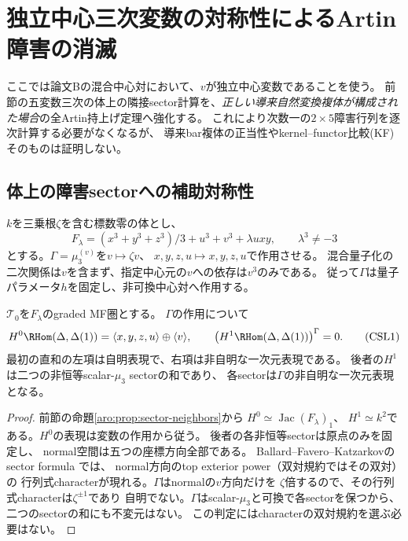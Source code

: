\section{独立中心三次変数の対称性によるArtin障害の消滅}
\label{csl:sec:symmetry}

ここでは論文Bの混合中心対において、$v$が独立中心変数であることを使う。
前節の五変数三次の体上の隣接sector計算を、\emph{正しい導来自然変換複体が構成された場合}の全Artin持上げ定理へ強化する。
これにより次数一の$2\times5$障害行列を逐次計算する必要がなくなるが、
導来bar複体の正当性やkernel--functor比較(KF)そのものは証明しない。

\subsection{体上の障害sectorへの補助対称性}
$k$を三乗根$\zeta$を含む標数零の体とし、
\[
 F_\lambda=(x^3+y^3+z^3)/3+u^3+v^3+\lambda uxy,
 \qquad \lambda^3\ne-3
\]
とする。$\Gamma=\mu_3^{(v)}$を$v\mapsto\zeta v$、
$x,y,z,u\mapsto x,y,z,u$で作用させる。
混合量子化の二次関係は$v$を含まず、指定中心元の$v$への依存は$v^3$のみである。
従って$\Gamma$は量子パラメータ$h$を固定し、非可換中心対へ作用する。

\begin{proposition}
\label{csl:prop:characters}
$\mathcal T_0$を$F_\lambda$のgraded MF圏とする。
$\Gamma$の作用について
\[
 H^0\RHom(\Delta,\Delta(1))
 =\langle x,y,z,u\rangle\oplus\langle v\rangle,
 \qquad
 \left(H^1\RHom(\Delta,\Delta(1))\right)^\Gamma=0.
 \tag{CSL1}\label{csl:eq:characters}
\]
最初の直和の左項は自明表現で、右項は非自明な一次元表現である。
後者の$H^1$は二つの非恒等scalar-$\mu_3$ sectorの和であり、
各sectorは$\Gamma$の非自明な一次元表現となる。
\end{proposition}
\begin{proof}
前節の命題\ref{aro:prop:sector-neighbors}から
$H^0\simeq\operatorname{Jac}(F_\lambda)_1$、
$H^1\simeq k^2$である。$H^0$の表現は変数の作用から従う。
後者の各非恒等sectorは原点のみを固定し、
normal空間は五つの座標方向全部である。
Ballard--Favero--Katzarkovのsector formula
\cite[Theorem~5.39, proof]{AROBFK}では、
normal方向のtop exterior power（双対規約ではその双対）の
行列式characterが現れる。$\Gamma$はnormalの$v$方向だけを
$\zeta$倍するので、その行列式characterは$\zeta^{\pm1}$であり
自明でない。$\Gamma$はscalar-$\mu_3$と可換で各sectorを保つから、
二つのsectorの和にも不変元はない。
この判定にはcharacterの双対規約を選ぶ必要はない。
\end{proof}

